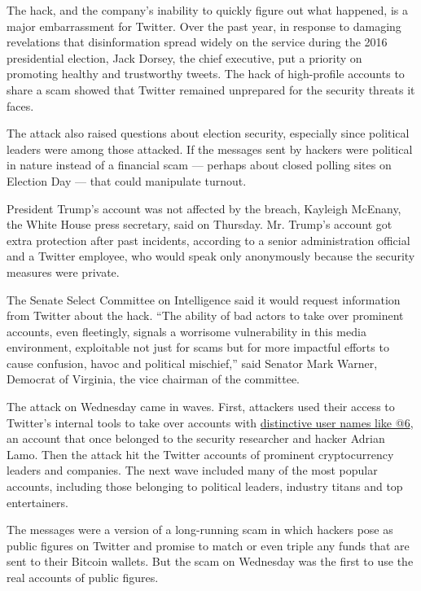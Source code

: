 The hack, and the company's inability to quickly figure out what
happened, is a major embarrassment for Twitter. Over the past year, in
response to damaging revelations that disinformation spread widely on
the service during the 2016 presidential election, Jack Dorsey, the
chief executive, put a priority on promoting healthy and trustworthy
tweets. The hack of high-profile accounts to share a scam showed that
Twitter remained unprepared for the security threats it faces.

The attack also raised questions about election security, especially
since political leaders were among those attacked. If the messages sent
by hackers were political in nature instead of a financial scam ---
perhaps about closed polling sites on Election Day --- that could
manipulate turnout.

President Trump's account was not affected by the breach, Kayleigh
McEnany, the White House press secretary, said on Thursday. Mr. Trump's
account got extra protection after past incidents, according to a senior
administration official and a Twitter employee, who would speak only
anonymously because the security measures were private.

The Senate Select Committee on Intelligence said it would request
information from Twitter about the hack. ``The ability of bad actors to
take over prominent accounts, even fleetingly, signals a worrisome
vulnerability in this media environment, exploitable not just for scams
but for more impactful efforts to cause confusion, havoc and political
mischief,'' said Senator Mark Warner, Democrat of Virginia, the vice
chairman of the committee.

The attack on Wednesday came in waves. First, attackers used their
access to Twitter's internal tools to take over accounts with
\href{https://medium.com/@lucky225/the-twitter-hack-what-exactly-happened-d8740d33c1c}{distinctive
user names like @6}, an account that once belonged to the security
researcher and hacker Adrian Lamo. Then the attack hit the Twitter
accounts of prominent cryptocurrency leaders and companies. The next
wave included many of the most popular accounts, including those
belonging to political leaders, industry titans and top entertainers.

The messages were a version of a long-running scam in which hackers pose
as public figures on Twitter and promise to match or even triple any
funds that are sent to their Bitcoin wallets. But the scam on Wednesday
was the first to use the real accounts of public figures.

